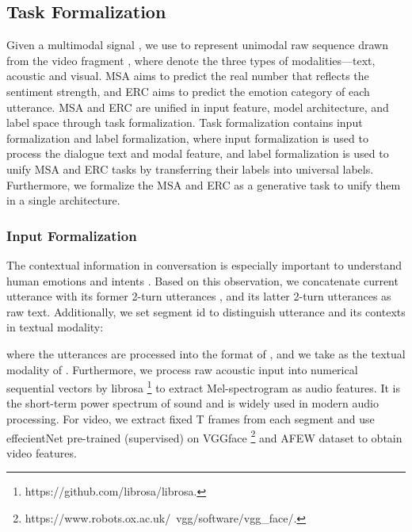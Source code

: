 \documentclass[11pt]{article}
\begin{document}
\subsection{Task Formalization}
Given a multimodal signal , we use  to represent unimodal raw sequence drawn from the video fragment , where  denote the three types of modalities—text, acoustic and visual. MSA aims to predict the real number  that reflects the sentiment strength, and ERC aims to predict the emotion category of each utterance. MSA and ERC are unified in input feature, model architecture, and label space through task formalization. Task formalization contains input formalization and label formalization, where input formalization is used to process the dialogue text and modal feature, and label formalization is used to unify MSA and ERC tasks by transferring their labels into universal labels. Furthermore, we formalize the MSA and ERC as a generative task to unify them in a single architecture.

\subsubsection{Input Formalization}
The contextual information in conversation is especially important to understand human emotions and intents \cite{DBLP:journals/corr/abs-2108-11626,DBLP:conf/icassp/HuHWJM22}. Based on this observation, we concatenate current utterance  with its former 2-turn utterances , and its latter 2-turn utterances  as raw text. Additionally, we set segment id  to distinguish utterance  and its contexts in textual modality:

where the utterances are processed into the format of , and we take  as the textual modality of .
Furthermore, we process raw acoustic input into numerical sequential vectors by librosa \footnote{https://github.com/librosa/librosa.} to extract Mel-spectrogram as audio features. It is the short-term power spectrum of sound and is widely used in modern audio processing. For video, we extract fixed T frames from each segment and use effecientNet \cite{DBLP:conf/icml/TanL19} pre-trained (supervised) on VGGface \footnote{https://www.robots.ox.ac.uk/~vgg/software/vgg\_face/.} and AFEW dataset to obtain video features.
\end{document}
